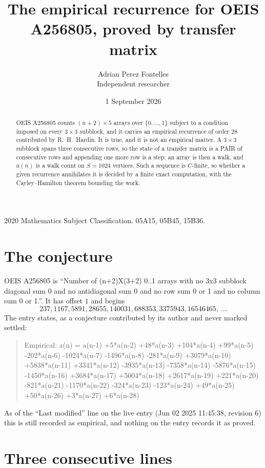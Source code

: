 \documentclass[11pt,a4paper]{article}
\title{The empirical recurrence for OEIS A256805, proved by transfer matrix}
\author{Adrian Perez Fontelles\\ \small Independent researcher}
\date{1 September 2026}
\theoremstyle{plain}
\theoremstyle{definition}
\begin{document}
\maketitle

\begin{abstract}
OEIS A256805 counts $(n+2)\times5$ arrays over $\{0,\dots,1\}$ subject to a condition imposed on
every $3\times3$ subblock, and it carries an empirical recurrence of order $28$
contributed by R.~H.~Hardin. It is true, and it is not an empirical matter. A $3\times3$
subblock spans three consecutive rows, so the state of a transfer matrix is a PAIR of
consecutive rows and appending one more row is a step; an array is then a walk, and
$a(n)$ is a walk count on $S=1024$ vertices. Such a sequence is $C$-finite, so whether a given
recurrence annihilates it is decided by a finite exact computation, with the Cayley--Hamilton
theorem bounding the work.
\end{abstract}

\noindent\small 2020 Mathematics Subject Classification. 05A15, 05B45, 15B36.\normalsize

\section{The conjecture}

OEIS A256805 is ``Number of (n+2)X(3+2) 0..1 arrays with no 3x3 subblock diagonal sum 0 and no antidiagonal sum 0 and no row sum 0 or 1 and no column sum 0 or 1.''. It has offset $1$ and begins
\[
237, 1167, 5891, 28655, 140031, 688353, 3375943, 16546465,\ \dots
\]
The entry states, as a conjecture contributed by its author and never marked settled:
\begin{quote}
Empirical: a(n) = a(n-1) +5*a(n-2) +48*a(n-3) +104*a(n-4) +99*a(n-5) -202*a(n-6) -1024*a(n-7) -1496*a(n-8) -281*a(n-9) +3079*a(n-10) +5838*a(n-11) +3341*a(n-12) -3935*a(n-13) -7358*a(n-14) -5876*a(n-15) -1450*a(n-16) +3684*a(n-17) +5004*a(n-18) +2617*a(n-19) +221*a(n-20) -821*a(n-21) -1170*a(n-22) -324*a(n-23) -123*a(n-24) +49*a(n-25) +50*a(n-26) +3*a(n-27) +6*a(n-28)
\end{quote}
As of the ``Last modified'' line on the live entry (Jun 02 2025 11:45:38, revision 6) this is still
recorded as empirical, and nothing on the entry records it as proved.

\section{Three consecutive lines}
\end{document}
